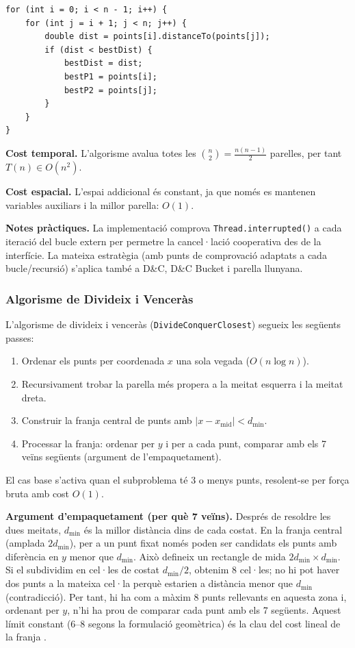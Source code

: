 \documentclass[conference,compsoc]{IEEEtran}
\begin{document}
\begin{lstlisting}[caption={Nucli de l'algorisme de força bruta.},label={lst:brute}]
for (int i = 0; i < n - 1; i++) {
    for (int j = i + 1; j < n; j++) {
        double dist = points[i].distanceTo(points[j]);
        if (dist < bestDist) {
            bestDist = dist;
            bestP1 = points[i];
            bestP2 = points[j];
        }
    }
}
\end{lstlisting}

\textbf{Cost temporal.} L'algorisme avalua totes les
$\binom{n}{2}=\frac{n(n-1)}{2}$ parelles, per tant
$T(n)\in O(n^2)$.

\textbf{Cost espacial.} L'espai addicional és constant, ja que només
es mantenen variables auxiliars i la millor parella:
$O(1)$.

\textbf{Notes pràctiques.} La implementació comprova
\texttt{Thread.interrupted()} a cada iteració del bucle extern per
permetre la cancel·lació cooperativa des de la interfície. La mateixa
estratègia (amb punts de comprovació adaptats a cada bucle/recursió)
s'aplica també a D\&C, D\&C Bucket i parella llunyana.

\subsubsection{Algorisme de Divideix i Venceràs}
\label{sec:dc}

L'algorisme de divideix i venceràs (\texttt{DivideConquerClosest})
segueix les següents passes:

\begin{enumerate}
    \item Ordenar els punts per coordenada $x$ una sola vegada ($O(n \log n)$).
    \item Recursivament trobar la parella més propera a la meitat
          esquerra i la meitat dreta.
    \item Construir la franja central de punts amb $|x - x_{\text{mid}}| < d_{\min}$.
    \item Processar la franja: ordenar per $y$ i per a cada punt,
          comparar amb els 7 veïns següents (argument de l'empaquetament).
\end{enumerate}

El cas base s'activa quan el subproblema té 3 o menys punts, resolent-se
per força bruta amb cost $O(1)$.

\textbf{Argument d'empaquetament (per què 7 veïns).}
Després de resoldre les dues meitats, $d_{\min}$ és la millor distància
dins de cada costat. En la franja central (amplada $2d_{\min}$), per a un
punt fixat només poden ser candidats els punts amb diferència en $y$ menor
que $d_{\min}$. Això defineix un rectangle de mida
$2d_{\min} \times d_{\min}$. Si el subdividim en cel·les de costat
$d_{\min}/2$, obtenim 8 cel·les; no hi pot haver dos punts a la mateixa
cel·la perquè estarien a distància menor que $d_{\min}$ (contradicció).
Per tant, hi ha com a màxim 8 punts rellevants en aquesta zona i,
ordenant per $y$, n'hi ha prou de comparar cada punt amb els 7 següents.
Aquest límit constant (6--8 segons la formulació geomètrica) és la clau
del cost lineal de la franja \cite{ref_gfg_closest}.
\end{document}
